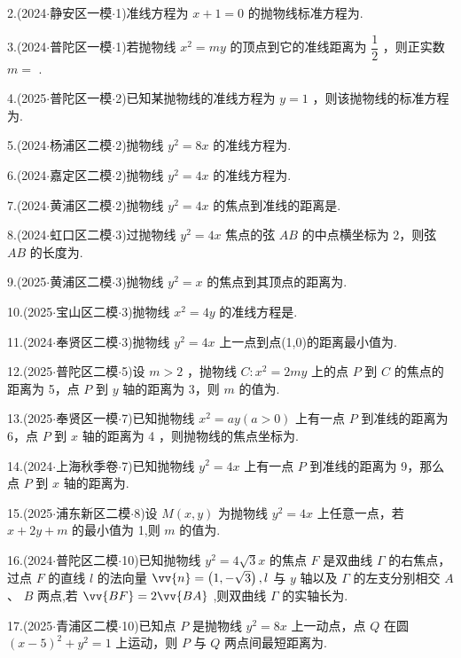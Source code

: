 2.(2024$\cdot$静安区一模$\cdot$1)准线方程为 $x + 1 = 0$ 的抛物线标准方程为\blkda[2]{}.

3.(2024$\cdot$普陀区一模$\cdot$1)若抛物线 ${x}^{2} = {my}$ 的顶点到它的准线距离为 $\dfrac{1}{2}$ ，则正实数 $m =$ \blkda[2]{}.

4.(2025$\cdot$普陀区一模$\cdot$2)已知某抛物线的准线方程为 $y = 1$ ，则该抛物线的标准方程为\blkda[2]{}.

5.(2024$\cdot$杨浦区二模$\cdot$2)抛物线 ${y}^{2} = {8x}$ 的准线方程为\blkda[2]{}.

6.(2024$\cdot$嘉定区二模$\cdot$2)抛物线 ${y}^{2} = {4x}$ 的准线方程为\blkda[2]{}.

7.(2024$\cdot$黄浦区二模$\cdot$2)抛物线 ${y}^{2} = {4x}$ 的焦点到准线的距离是\blkda[2]{}.

8.(2024$\cdot$虹口区二模$\cdot$3)过抛物线 ${y}^{2} = {4x}$ 焦点的弦 ${AB}$ 的中点横坐标为 2，则弦 ${AB}$ 的长度为\blkda[2]{}.

9.(2025$\cdot$黄浦区二模$\cdot$3)抛物线 ${y}^{2} = x$ 的焦点到其顶点的距离为\blkda[2]{}.

10.(2025$\cdot$宝山区二模$\cdot$3)抛物线 ${x}^{2} = {4y}$ 的准线方程是\blkda[2]{}.

11.(2024$\cdot$奉贤区二模$\cdot$3)抛物线 ${y}^{2} = {4x}$ 上一点到点(1,0)的距离最小值为\blkda[2]{}.

12.(2025$\cdot$普陀区二模$\cdot$5)设 $m > 2$ ，抛物线 $C : {x}^{2} = {2my}$ 上的点 $P$ 到 $C$ 的焦点的距离为 5，点 $P$ 到 $y$ 轴的距离为 3，则 $m$ 的值为\blkda[2]{}.

13.(2025$\cdot$奉贤区一模$\cdot$7)已知抛物线 ${x}^{2} = {ay}\left( {a > 0}\right)$ 上有一点 $P$ 到准线的距离为 6，点 $P$ 到 $x$ 轴的距离为 4 ，则抛物线的焦点坐标为\blkda[2]{}.

14.(2024$\cdot$上海秋季卷$\cdot$7)已知抛物线 ${y}^{2} = {4x}$ 上有一点 $P$ 到准线的距离为 9，那么点 $P$ 到 $x$ 轴的距离为\blkda[2]{}.

15.(2025$\cdot$浦东新区二模$\cdot$8)设 $M\left( {x,y}\right)$ 为抛物线 ${y}^{2} = {4x}$ 上任意一点，若 $x + {2y} + m$ 的最小值为 1,则 $m$ 的值为\blkda[2]{}.

16.(2024$\cdot$普陀区二模$\cdot$10)已知抛物线 ${y}^{2} = 4\sqrt{3}x$ 的焦点 $F$ 是双曲线 $\Gamma$ 的右焦点，过点 $F$ 的直线 $l$ 的法向量 $\vv{n} = \left( {1, - \sqrt{3}}\right) ,l$ 与 $y$ 轴以及 $\Gamma$ 的左支分别相交 $A$ 、 $B$ 两点,若 $\vv{BF} = 2\vv{BA}$ ,则双曲线 $\Gamma$ 的实轴长为\blkda[2]{}.

17.(2025$\cdot$青浦区二模$\cdot$10)已知点 $P$ 是抛物线 ${y}^{2} = {8x}$ 上一动点，点 $Q$ 在圆 ${\left( x - 5\right) }^{2} + {y}^{2} = 1$ 上运动，则 $P$ 与 $Q$ 两点间最短距离为\blkda[2]{}.

